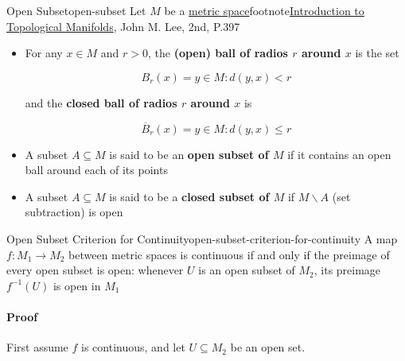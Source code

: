 \begin{Definition}{Open Subset}{open-subset}
    Let $M$ be a \hyperref[def:metrix-space]{metric space}footnote{\href{https://trello.com/c/SI33o8fG}{Introduction to Topological Manifolds}, John M. Lee, 2nd, P.397}

    \begin{itemize}
        \item For any $x \in M$ and $r > 0$, the \textbf{(open) ball of radios $r$ around $x$} is the set

              \begin{equation}
                  B_r(x) = {y \in M : d(y, x) < r}
              \end{equation}

              and the \textbf{closed ball of radios $r$ around $x$} is

              \begin{equation}
                  \overline{B}_r(x) = {y \in M : d(y, x) \le r}
              \end{equation}

        \item A subset $A \subseteq M$ is said to be an \textbf{open subset of $M$} if it contains an open ball around
              each of its points
        \item A subset $A \subseteq M$ is said to be a \textbf{closed subset of $M$} if $M \smallsetminus A$ (set
              subtraction) is open
    \end{itemize}
\end{Definition}

\begin{Theorem}{Open Subset Criterion for Continuity}{open-subset-criterion-for-continuity}
    A map $f: M_1 \rightarrow M_2$ between metric spaces is continuous if and only if the preimage of every open subset
    is open: whenever $U$ is an open subset of $M_2$, its preimage $f^{-1}(U)$ is open in $M_1$
\end{Theorem}

\paragraph{Proof} First assume $f$ is continuous, and let $U \subseteq M_2$ be an open set.

